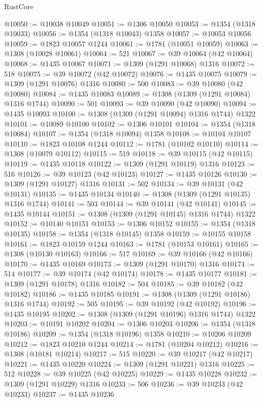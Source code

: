 \begin{lexlean}{RustCore}
\begin{coremodule}
@10050 := @10038 @10049
@10051 := @1306 @10050
@10053 := @1354 (@1318 @10033)
@10056 := @1354 (@1318 @10043) @1358
@10057 := @10053 @10056
@10059 := @1823 @10057 @1244
@10061 := @1781 (@10051 @10059)
@10063 := @1308 (@10028 @10061)
@10064 := 521
@10067 := @39 @10064 (@42 @10064)
@10068 := @1435 @10067
@10071 := @1309 (@1291 @10068) @1316
@10072 := 518
@10075 := @39 @10072 (@42 @10072)
@10076 := @1435 @10075
@10079 := @1309 (@1291 @10076) @1316
@10080 := 500
@10083 := @39 @10080 (@42 @10080)
@10084 := @1435 @10083
@10089 := @1308 (@1309 (@1291 @10084) @1316 @1744)
@10090 := 501
@10093 := @39 @10090 (@42 @10090)
@10094 := @1435 @10093
@10100 := @1308 (@1309 (@1291 @10094) @1316 @1744) @1322
@10101 := @10089 @10100
@10102 := @1306 @10101
@10104 := @1354 (@1318 @10084)
@10107 := @1354 (@1318 @10094) @1358
@10108 := @10104 @10107
@10110 := @1823 @10108 @1244
@10112 := @1781 (@10102 @10110)
@10114 := @1308 (@10079 @10112)
@10115 := 519
@10118 := @39 @10115 (@42 @10115)
@10119 := @1435 @10118
@10122 := @1309 (@1291 @10119) @1316
@10123 := 516
@10126 := @39 @10123 (@42 @10123)
@10127 := @1435 @10126
@10130 := @1309 (@1291 @10127) @1316
@10131 := 502
@10134 := @39 @10131 (@42 @10131)
@10135 := @1435 @10134
@10140 := @1308 (@1309 (@1291 @10135) @1316 @1744)
@10141 := 503
@10144 := @39 @10141 (@42 @10141)
@10145 := @1435 @10144
@10151 := @1308 (@1309 (@1291 @10145) @1316 @1744) @1322
@10152 := @10140 @10151
@10153 := @1306 @10152
@10155 := @1354 (@1318 @10135)
@10158 := @1354 (@1318 @10145) @1358
@10159 := @10155 @10158
@10161 := @1823 @10159 @1244
@10163 := @1781 (@10153 @10161)
@10165 := @1308 (@10130 @10163)
@10166 := 517
@10169 := @39 @10166 (@42 @10166)
@10170 := @1435 @10169
@10173 := @1309 (@1291 @10170) @1316
@10174 := 514
@10177 := @39 @10174 (@42 @10174)
@10178 := @1435 @10177
@10181 := @1309 (@1291 @10178) @1316
@10182 := 504
@10185 := @39 @10182 (@42 @10182)
@10186 := @1435 @10185
@10191 := @1308 (@1309 (@1291 @10186) @1316 @1744)
@10192 := 505
@10195 := @39 @10192 (@42 @10192)
@10196 := @1435 @10195
@10202 := @1308 (@1309 (@1291 @10196) @1316 @1744) @1322
@10203 := @10191 @10202
@10204 := @1306 @10203
@10206 := @1354 (@1318 @10186)
@10209 := @1354 (@1318 @10196) @1358
@10210 := @10206 @10209
@10212 := @1823 @10210 @1244
@10214 := @1781 (@10204 @10212)
@10216 := @1308 (@10181 @10214)
@10217 := 515
@10220 := @39 @10217 (@42 @10217)
@10221 := @1435 @10220
@10224 := @1309 (@1291 @10221) @1316
@10225 := 512
@10228 := @39 @10225 (@42 @10225)
@10229 := @1435 @10228
@10232 := @1309 (@1291 @10229) @1316
@10233 := 506
@10236 := @39 @10233 (@42 @10233)
@10237 := @1435 @10236

\end{coremodule}
\end{lexlean}
